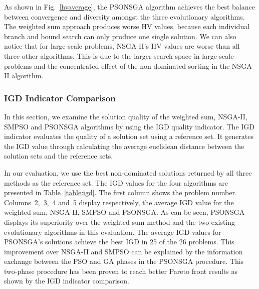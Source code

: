 \documentclass[10pt,journal,compsoc]{IEEEtran}
\newcommand{\Fig}[1]{Fig.~\ref{#1}}
\begin{document}
As shown in \Fig{hvaverage}, the PSONSGA algorithm achieves the best balance between convergence and diversity amongst the three evolutionary algorithms. The weighted sum approach produces worse HV values, because each individual branch and bound search can only produce one single solution. We can also notice that for large-scale problems, NSGA-II's HV values are worse than all three other algorithms. This is due to the larger search space in large-scale problems and the concentrated effect of the non-dominated sorting in the NSGA-II algorithm.


\subsubsection{IGD Indicator Comparison}
In this section, we examine the solution quality of the weighted sum, NSGA-II, SMPSO and PSONSGA algorithms by using the IGD quality indicator. The IGD indicator evaluates the quality of a solution set using a reference set. It generates the IGD value through calculating the average euclidean distance between the solution sets and the reference sets. %

In our evaluation, we use the best non-dominated solutions returned by all three methods as the reference set. The IGD values for the four algorithms are presented in Table~\ref{table:igd}. The first column shows the problem number. Columns~2,~3,~4 and~5 display respectively, the average IGD value for the weighted sum, NSGA-II, SMPSO and PSONSGA. As can be seen, PSONSGA displays its superiority over the weighted sum method and the two existing evolutionary algorithms in this evaluation. The average IGD values for PSONSGA's solutions achieve the best IGD in 25 of the 26 problems. This improvement over NSGA-II and SMPSO can be explained by the information exchange between the PSO and GA phases in the PSONSGA procedure. This two-phase procedure has been proven to reach better Pareto front results as shown by the IGD indicator comparison.
\end{document}
